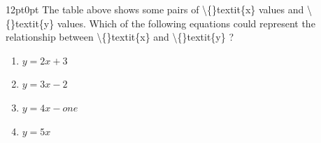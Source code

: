 \documentclass[11pt, twocolumn]{article}
\newcounter{questionnum}
\begin{document}
\vspace{6pt}\noindent
\begin{minipage}{\columnwidth}\raggedright
\noindent{}\par\vspace{8pt}
\begin{adjustwidth}{12pt}{0pt}
The table above shows some pairs of \textbackslash\{\}textit\{x\} values and \textbackslash\{\}textit\{y\} values. Which of the following equations could represent the relationship between \textbackslash\{\}textit\{x\} and \textbackslash\{\}textit\{y\} ?
\begin{enumerate}[label=\Alph*),leftmargin=18pt,topsep=3pt,itemsep=2pt]
  \item $y = 2 x + 3$
  \item $y = 3 x - 2$
  \item $y = 4 x - one$
  \item $y = 5 x$
\end{enumerate}
\end{adjustwidth}
\end{minipage}\par
\end{document}
